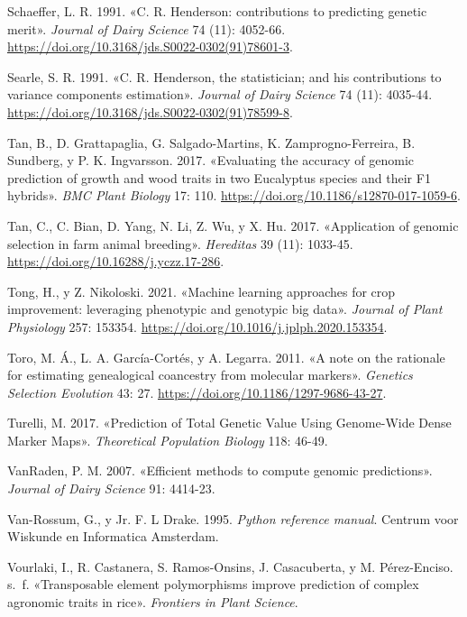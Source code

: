 \documentclass[11pt,spanish,a4paper,oneside,]{book} %
\begin{document}
\leavevmode\hypertarget{ref-cite:27}{}%
Schaeffer, L. R. 1991. «C. R. Henderson: contributions to predicting genetic merit». \emph{Journal of Dairy Science} 74 (11): 4052-66. \url{https://doi.org/10.3168/jds.S0022-0302(91)78601-3}.

\leavevmode\hypertarget{ref-cite:29}{}%
Searle, S. R. 1991. «C. R. Henderson, the statistician; and his contributions to variance components estimation». \emph{Journal of Dairy Science} 74 (11): 4035-44. \url{https://doi.org/10.3168/jds.S0022-0302(91)78599-8}.

\leavevmode\hypertarget{ref-cite:79}{}%
Tan, B., D. Grattapaglia, G. Salgado-Martins, K. Zamprogno-Ferreira, B. Sundberg, y P. K. Ingvarsson. 2017. «Evaluating the accuracy of genomic prediction of growth and wood traits in two Eucalyptus species and their F1 hybrids». \emph{BMC Plant Biology} 17: 110. \url{https://doi.org/10.1186/s12870-017-1059-6}.

\leavevmode\hypertarget{ref-cite:34}{}%
Tan, C., C. Bian, D. Yang, N. Li, Z. Wu, y X. Hu. 2017. «Application of genomic selection in farm animal breeding». \emph{Hereditas} 39 (11): 1033-45. \url{https://doi.org/10.16288/j.yczz.17-286}.

\leavevmode\hypertarget{ref-cite:7}{}%
Tong, H., y Z. Nikoloski. 2021. «Machine learning approaches for crop improvement: leveraging phenotypic and genotypic big data». \emph{Journal of Plant Physiology} 257: 153354. \url{https://doi.org/10.1016/j.jplph.2020.153354}.

\leavevmode\hypertarget{ref-cite:71}{}%
Toro, M. Á., L. A. García-Cortés, y A. Legarra. 2011. «A note on the rationale for estimating genealogical coancestry from molecular markers». \emph{Genetics Selection Evolution} 43: 27. \url{https://doi.org/10.1186/1297-9686-43-27}.

\leavevmode\hypertarget{ref-cite:9}{}%
Turelli, M. 2017. «Prediction of Total Genetic Value Using Genome-Wide Dense Marker Maps». \emph{Theoretical Population Biology} 118: 46-49.

\leavevmode\hypertarget{ref-cite:39}{}%
VanRaden, P. M. 2007. «Efficient methods to compute genomic predictions». \emph{Journal of Dairy Science} 91: 4414-23.

\leavevmode\hypertarget{ref-cite:53}{}%
Van-Rossum, G., y Jr. F. L Drake. 1995. \emph{Python reference manual}. Centrum voor Wiskunde en Informatica Amsterdam.

\leavevmode\hypertarget{ref-cite:26}{}%
Vourlaki, I., R. Castanera, S. Ramos-Onsins, J. Casacuberta, y M. Pérez-Enciso. s.~f. «Transposable element polymorphisms improve prediction of complex agronomic traits in rice». \emph{Frontiers in Plant Science}.
\end{document}
